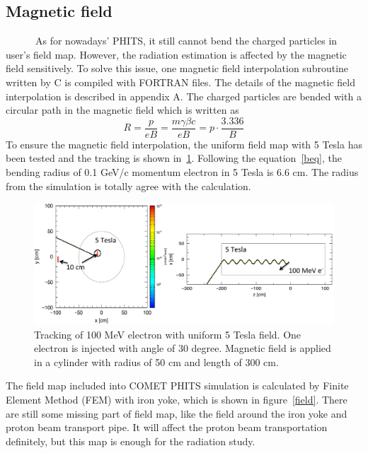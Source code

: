  \subsection{Magnetic field}
~~~~~~As for nowadays' PHITS, it still cannot bend the charged particles in user's field map.
However, the radiation estimation is affected by the magnetic field sensitively.
To solve this issue, one magnetic field interpolation subroutine written by C is compiled with FORTRAN files.
The details of the magnetic field interpolation is described in appendix A.
The charged particles are bended with a circular path in the magnetic field which is written as
\begin{equation}
 R = \frac{p}{eB} = \frac{m\gamma \beta c}{eB} = p \cdot \frac{3.336}{B}
\label{beq}
\end{equation}
To ensure the magnetic field interpolation, the uniform field map with 5 Tesla has been tested and the tracking is shown in~\ref{2uniform}.
Following the equation~\ref{beq}, the bending radius of 0.1 GeV/c momentum electron in 5 Tesla is 6.6 cm.
The radius from the simulation is totally agree with the calculation.
 \begin{figure}[H]
  \centering
  \includegraphics[scale=0.45]{chapter3/fig/magtest.pdf}
  \caption{Tracking of 100 MeV electron with uniform 5 Tesla field. One electron is injected with angle of 30 degree. Magnetic field is applied in a cylinder with radius of 50 cm and length of 300 cm.}
  \label{2uniform}
 \end{figure}
The field map included into COMET PHITS simulation is calculated by Finite Element Method (FEM) with iron yoke, which is shown in figure~\ref{field}.
There are still some missing part of field map, like the field around the iron yoke and proton beam transport pipe.
It will affect the proton beam transportation definitely, but this map is enough for the radiation study.

